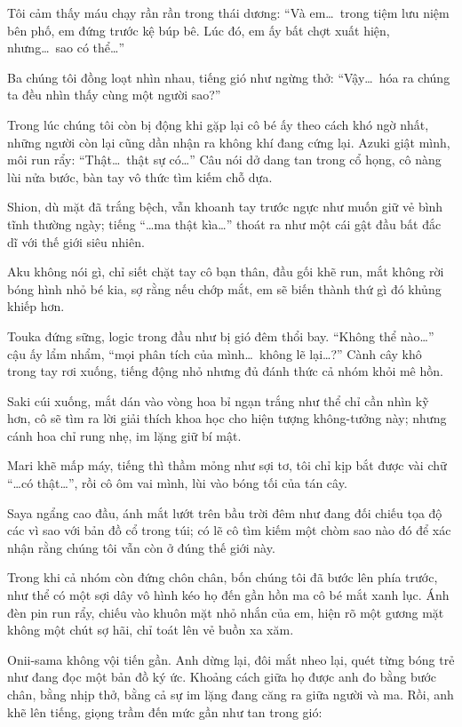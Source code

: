 \documentclass[../main.tex]{subfiles}
\begin{document}
Tôi cảm thấy máu chạy rần rần trong thái dương: ``Và em\dots\ trong tiệm lưu niệm bên phố, em đứng trước kệ búp bê. Lúc đó, em ấy bất chợt xuất hiện, nhưng\dots\ sao có thể\dots''

Ba chúng tôi đồng loạt nhìn nhau, tiếng gió như ngừng thở: ``Vậy\dots\ hóa ra chúng ta đều nhìn thấy cùng một người sao?''

Trong lúc chúng tôi còn bị động khi gặp lại cô bé ấy theo cách khó ngờ nhất, những người còn lại cũng dần nhận ra không khí đang cứng lại. Azuki giật mình, môi run rẩy: ``Thật\dots\ thật sự có\dots'' Câu nói dở dang tan trong cổ họng, cô nàng lùi nửa bước, bàn tay vô thức tìm kiếm chỗ dựa.

Shion, dù mặt đã trắng bệch, vẫn khoanh tay trước ngực như muốn giữ vẻ bình tĩnh thường ngày; tiếng ``\dots ma thật kìa\dots'' thoát ra như một cái gật đầu bất đắc dĩ với thế giới siêu nhiên.

Aku không nói gì, chỉ siết chặt tay cô bạn thân, đầu gối khẽ run, mắt không rời bóng hình nhỏ bé kia, sợ rằng nếu chớp mắt, em sẽ biến thành thứ gì đó khủng khiếp hơn.

Touka đứng sững, logic trong đầu như bị gió đêm thổi bay. ``Không thể nào\dots'' cậu ấy lẩm nhẩm, ``mọi phân tích của mình\dots\ không lẽ lại\dots?'' Cành cây khô trong tay rơi xuống, tiếng động nhỏ nhưng đủ đánh thức cả nhóm khỏi mê hồn.

Saki cúi xuống, mắt dán vào vòng hoa bỉ ngạn trắng như thể chỉ cần nhìn kỹ hơn, cô sẽ tìm ra lời giải thích khoa học cho hiện tượng không-tưởng này; nhưng cánh hoa chỉ rung nhẹ, im lặng giữ bí mật.

Mari khẽ mấp máy, tiếng thì thầm mỏng như sợi tơ, tôi chỉ kịp bắt được vài chữ ``\dots có thật\dots'', rồi cô ôm vai mình, lùi vào bóng tối của tán cây.

Saya ngẩng cao đầu, ánh mắt lướt trên bầu trời đêm như đang đối chiếu tọa độ các vì sao với bản đồ cổ trong túi; có lẽ cô tìm kiếm một chòm sao nào đó để xác nhận rằng chúng tôi vẫn còn ở đúng thế giới này.

Trong khi cả nhóm còn đứng chôn chân, bốn chúng tôi đã bước lên phía trước, như thể có một sợi dây vô hình kéo họ đến gần hồn ma cô bé mắt xanh lục. Ánh đèn pin run rẩy, chiếu vào khuôn mặt nhỏ nhắn của em, hiện rõ một gương mặt không một chút sợ hãi, chỉ toát lên vẻ buồn xa xăm.

Onii-sama không vội tiến gần. Anh dừng lại, đôi mắt nheo lại, quét từng bóng trẻ như đang đọc một bản đồ ký ức. Khoảng cách giữa họ được anh đo bằng bước chân, bằng nhịp thở, bằng cả sự im lặng đang căng ra giữa người và ma. Rồi, anh khẽ lên tiếng, giọng trầm đến mức gần như tan trong gió:
\end{document}
